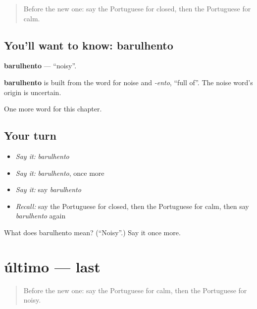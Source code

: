 \label{lesson:PT-C122-barulhento}



\begin{quote}
Before the new one: say the Portuguese for closed, then the Portuguese for calm.
\end{quote}

\subsection*{You'll want to know: barulhento}
\textbf{barulhento} — \textquotedblleft{}noisy\textquotedblright{}.

\begin{cousinweb}
\textbf{barulhento} is built from the word for noise and \emph{-ento}, \textquotedblleft{}full of\textquotedblright{}. The noise word's origin is uncertain.
\end{cousinweb}

\begin{grammarlens}[title={What you've built}]
One more word for this chapter.
\end{grammarlens}

\subsection*{Your turn}
\begin{itemize}
\raggedright
  \item \emph{Say it:} \emph{barulhento}
  \item \emph{Say it:} \emph{barulhento}, once more
  \item \emph{Say it:} say \emph{barulhento}
  \item \emph{Recall:} say the Portuguese for closed, then the Portuguese for calm, then say \emph{barulhento} again
\end{itemize}

\begin{tcolorbox}[breakable,colback=teal!4,colframe=teal!35!black,title={Before you move on}]
What does barulhento mean? (\textquotedblleft{}Noisy\textquotedblright{}.) Say it once more.
\end{tcolorbox}
\section[último]{último — last}

\label{lesson:PT-C122-ultimo}



\begin{quote}
Before the new one: say the Portuguese for calm, then the Portuguese for noisy.
\end{quote}

